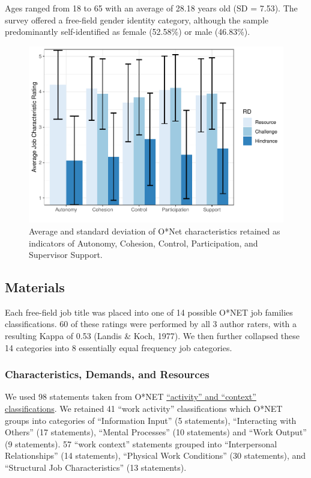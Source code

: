 \documentclass[
  english,
  man]{apa6}
\begin{document}
Ages ranged from 18 to 65 with an average of 28.18 years old (SD = 7.53). The survey offered a free-field gender identity category, although the sample predominantly self-identified as female (52.58\%) or male (46.83\%).

\begin{figure}
\centering
\includegraphics{Submission_files/figure-latex/litresources-1.pdf}
\caption{\label{fig:litresources}Average and standard deviation of O*Net characteristics retained as indicators of Autonomy, Cohesion, Control, Participation, and Supervisor Support.}
\end{figure}

\hypertarget{materials}{%
\subsection{Materials}\label{materials}}

Each free-field job title was placed into one of 14 possible O*NET job families classifications. 60 of these ratings were performed by all 3 author raters, with a resulting Kappa of 0.53 (Landis \& Koch, 1977). We then further collapsed these 14 categories into 8 essentially equal frequency job categories.

\hypertarget{characteristics-demands-and-resources}{%
\subsubsection{Characteristics, Demands, and Resources}\label{characteristics-demands-and-resources}}

We used 98 statements taken from O*NET \href{https://www.ONETonline.org/find/descriptor/result/4.A.1.b.3}{``activity'' and ``context'' classifications}. We retained 41 ``work activity'' classifications which O*NET groups into categories of ``Information Input'' (5 statements), ``Interacting with Others'' (17 statements), ``Mental Processes'' (10 statements) and ``Work Output'' (9 statements). 57 ``work context'' statements grouped into ``Interpersonal Relationships'' (14 statements), ``Physical Work Conditions'' (30 statements), and ``Structural Job Characteristics'' (13 statements).
\end{document}
